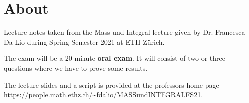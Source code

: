 \section*{About}

Lecture notes taken from the Mass und Integral lecture given by Dr. Francesca Da Lio during Spring Semester 2021 at ETH Zürich.

The exam will be a 20 minute \textbf{oral exam}. It will consist of two or three questions where we have to prove some results.

The lecture slides and a script is provided at the professors home page \url{https://people.math.ethz.ch/~fdalio/MASSundINTEGRALFS21}.


